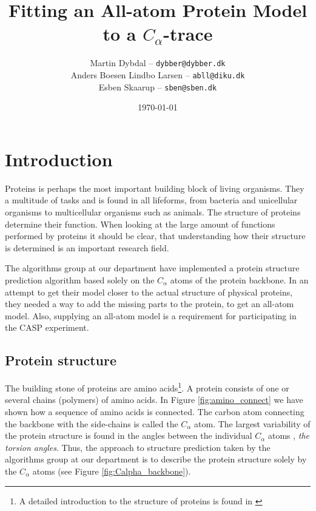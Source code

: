 \documentclass[10pt,a4paper,final,oneside,openany,article, twocolumn]{memoir}
\title{\vspace{-2cm}
  Fitting an All-atom Protein Model to a $C_\alpha$-trace\\
}
\author{
	Martin Dybdal -- \texttt{dybber@dybber.dk}\\
	Anders Boesen Lindbo Larsen -- \texttt{abll@diku.dk} \\
    Esben Skaarup -- \texttt{sben@sben.dk}
}
\date{\today}
\begin{document}

\tableofcontents

\chapter{Introduction}
Proteins is perhaps the most important building block of living
organisms. They a multitude of tasks and is found in all lifeforms,
from bacteria and unicellular organisms to multicellular organisms
such as animals. The structure of proteins determine their function. When looking at the large amount of functions
performed by proteins it should be clear, that understanding how their
structure is determined is an important research field.


The algorithms group at our department have implemented a protein
structure prediction algorithm based solely on the $C_\alpha$ atoms of
the protein backbone\cite{}. In an attempt to get their model closer
to the actual structure of physical proteins, they needed a way to add
the missing parts to the protein, to get an all-atom model.  Also,
supplying an all-atom model is a requirement for participating in the
CASP experiment\cite{caspwebsite}.

\section{Protein structure}
The building stone of proteins are amino acids\footnote{A detailed
  introduction to the structure of proteins is found in
  \cite{branden}}. A protein consists of one or several chains
(polymers) of amino acids. In Figure \ref{fig:amino_connect} we have
shown how a sequence of amino acids is connected. The carbon atom
connecting the backbone with the side-chains is called the $C_\alpha$
atom. The largest variability of the protein structure is found in the
angles between the individual $C_\alpha$ atoms \cite{lotan04},
\textit{the torsion angles}. Thus, the approach to structure
prediction taken by the algorithms group at our department is to
describe the protein structure solely by the $C_\alpha$ atoms (see
Figure \ref{fig:Calpha_backbone}).
\end{document}
